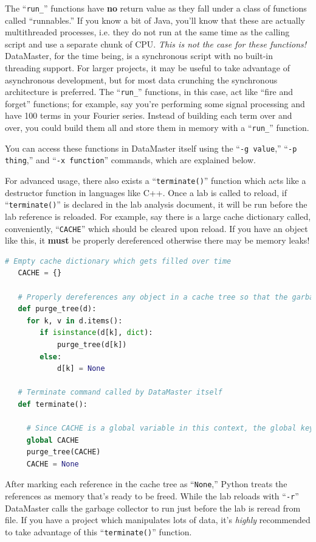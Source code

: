 \documentclass[12pt]{article}
\begin{document}
{The ``\texttt{run\_}'' functions have \textbf{no} return value as they fall under a class of functions called ``runnables.'' If you know a bit of Java, you'll know that these are actually multithreaded processes, i.e. they do not run at the same time as the calling script and use a separate chunk of CPU. \textit{This is not the case for these functions!} DataMaster, for the time being, is a synchronous script with no built-in threading support. For larger projects, it may be useful to take advantage of asynchronous development, but for most data crunching the synchronous architecture is preferred. The ``\texttt{run\_}'' functions, in this case, act like ``fire and forget'' functions; for example, say you're performing some signal processing and have 100 terms in your Fourier series. Instead of building each term over and over, you could build them all and store them in memory with a ``\texttt{run\_}'' function.

You can access these functions in DataMaster itself using the ``\texttt{-g value},'' ``\texttt{-p thing},'' and ``\texttt{-x function}'' commands, which are explained below.

For advanced usage, there also exists a ``\texttt{terminate()}'' function which acts like a destructor function in languages like C++. Once a lab is called to reload, if ``\texttt{terminate()}'' is declared in the lab analysis document, it will be run before the lab reference is reloaded. For example, say there is a large cache dictionary called, conveniently, ``\texttt{CACHE}'' which should be cleared upon reload. If you have an object like this, it \textbf{must} be properly dereferenced otherwise there may be memory leaks!
\begin{framed}
  \begin{lstlisting}[language=Python]
   # Empty cache dictionary which gets filled over time
   CACHE = {}
   
   # Properly dereferences any object in a cache tree so that the garbage collector can free memory
   def purge_tree(d):
     for k, v in d.items():
        if isinstance(d[k], dict):
            purge_tree(d[k])
        else:
            d[k] = None
            
   # Terminate command called by DataMaster itself
   def terminate():
     
     # Since CACHE is a global variable in this context, the global keyword must be used to specify that we're modifying the global
     global CACHE 
     purge_tree(CACHE)
     CACHE = None
  \end{lstlisting}
\end{framed}
After marking each reference in the cache tree as ``\texttt{None},'' Python treats the references as memory that's ready to be freed. While the lab reloads with ``\texttt{-r}'' DataMaster calls the garbage collector to run just before the lab is reread from file. If you have a project which manipulates lots of data, it's \textit{highly} recommended to take advantage of this ``\texttt{terminate()}'' function.

}
\end{document}
